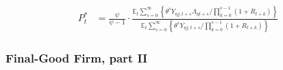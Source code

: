 \documentclass[
	12pt,
	]{article}
\numberwithin{equation}{section}
\newcommand{\E}[1][t]{{\mathbb{E}_{#1}}}
\theoremstyle{definition}
\theoremstyle{plain}
\theoremstyle{plain}
\theoremstyle{plain}
\begin{document}
%
%


\begin{align}
	\label{eq:int-good-firm-optimal-price-FOC-3}
	P_t^\ast &= 
	\frac{\psi}{\psi-1} \cdot
	\frac{
		\E \sum_{s=0}^{\infty} \left\{ 
		\theta^s Y_{\eta j,t+s} \Lambda_{\eta t+s} / \prod_{k=0}^{s-1}(1+R_{t+k}) \right\} } {\E \sum_{s=0}^{\infty} \left\{
		\theta^s Y_{\eta j,t+s} / \prod_{k=0}^{s-1}(1+R_{t+k}) \right\}}
\end{align}


\subsubsection{Final-Good Firm, part II}
\end{document}
